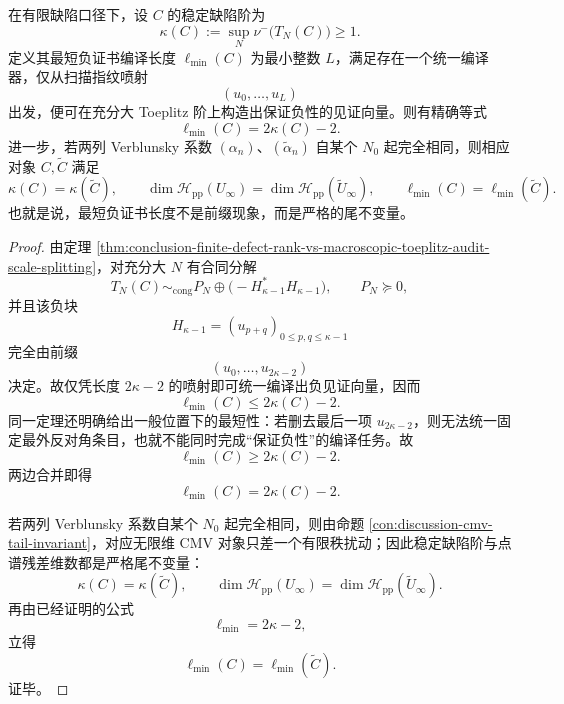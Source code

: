\begin{theorem}\label{thm:conclusion-toeplitz-shortest-negative-certificate-tail-rigidity}
在有限缺陷口径下，设 \(C\) 的稳定缺陷阶为
\[
\kappa(C):=\sup_N \nu^{-}\!\bigl(T_N(C)\bigr)\ge 1.
\]
定义其最短负证书编译长度 \(\ell_{\min}(C)\) 为最小整数 \(L\)，满足存在一个统一编译器，仅从扫描指纹喷射
\[
(u_0,\dots,u_L)
\]
出发，便可在充分大 Toeplitz 阶上构造出保证负性的见证向量。则有精确等式
\[
\ell_{\min}(C)=2\kappa(C)-2.
\]
进一步，若两列 Verblunsky 系数 \((\alpha_n)\)、\((\widetilde\alpha_n)\) 自某个 \(N_0\) 起完全相同，则相应对象 \(C,\widetilde C\) 满足
\[
\kappa(C)=\kappa(\widetilde C),
\qquad
\dim \mathcal H_{\mathrm{pp}}(U_\infty)=\dim \mathcal H_{\mathrm{pp}}(\widetilde U_\infty),
\qquad
\ell_{\min}(C)=\ell_{\min}(\widetilde C).
\]
也就是说，最短负证书长度不是前缀现象，而是严格的尾不变量。
\end{theorem}
\begin{proof}
由定理 \ref{thm:conclusion-finite-defect-rank-vs-macroscopic-toeplitz-audit-scale-splitting}，对充分大 \(N\) 有合同分解
\[
T_N(C)\sim_{\mathrm{cong}} P_N\oplus\bigl(-H_{\kappa-1}^\ast H_{\kappa-1}\bigr),
\qquad
P_N\succeq 0,
\]
并且该负块
\[
H_{\kappa-1}=(u_{p+q})_{0\le p,q\le \kappa-1}
\]
完全由前缀
\[
(u_0,\dots,u_{2\kappa-2})
\]
决定。故仅凭长度 \(2\kappa-2\) 的喷射即可统一编译出负见证向量，因而
\[
\ell_{\min}(C)\le 2\kappa(C)-2.
\]
同一定理还明确给出一般位置下的最短性：若删去最后一项 \(u_{2\kappa-2}\)，则无法统一固定最外反对角条目，也就不能同时完成“保证负性”的编译任务。故
\[
\ell_{\min}(C)\ge 2\kappa(C)-2.
\]
两边合并即得
\[
\ell_{\min}(C)=2\kappa(C)-2.
\]

若两列 Verblunsky 系数自某个 \(N_0\) 起完全相同，则由命题 \ref{con:discussion-cmv-tail-invariant}，对应无限维 CMV 对象只差一个有限秩扰动；因此稳定缺陷阶与点谱残差维数都是严格尾不变量：
\[
\kappa(C)=\kappa(\widetilde C),
\qquad
\dim \mathcal H_{\mathrm{pp}}(U_\infty)=\dim \mathcal H_{\mathrm{pp}}(\widetilde U_\infty).
\]
再由已经证明的公式
\[
\ell_{\min}=2\kappa-2,
\]
立得
\[
\ell_{\min}(C)=\ell_{\min}(\widetilde C).
\]
证毕。
\end{proof}

